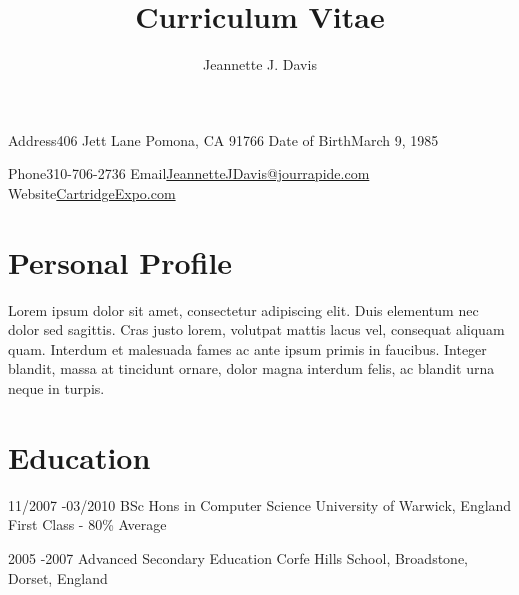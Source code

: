 \documentclass[10pt]{article} %
\title{Curriculum Vitae}
\author{Jeannette J. Davis}
\begin{document}
\makecvtitle

\begin{cvinfosection}{
  \begin{cvinfocolumn}
    {Address}{406 Jett Lane}
    {}{Pomona, CA 91766}
    {Date of Birth}{March 9, 1985}
    {}{}
  \end{cvinfocolumn}
}
{
  \begin{cvinfocolumn}
    {Phone}{310-706-2736}
    {Email}{\href{mailto:JeannetteJDavis@jourrapide.com}{JeannetteJDavis@jourrapide.com}}
    {Website}{\href{http://CartridgeExpo.com}{CartridgeExpo.com}}
    {}{}
  \end{cvinfocolumn}
}
\end{cvinfosection}

\section*{Personal Profile}

Lorem ipsum dolor sit amet, consectetur adipiscing elit. Duis elementum nec dolor sed sagittis. Cras justo lorem, volutpat mattis lacus vel, consequat aliquam quam. Interdum et malesuada fames ac ante ipsum primis in faucibus. Integer blandit, massa at tincidunt ornare, dolor magna interdum felis, ac blandit urna neque in turpis.




\section*{Education}

\begin{education}
  {11/2007 -}{03/2010}
  {BSc Hons in Computer Science}
  {University of Warwick, England}
  {First Class - 80\% Average}
\end{education}


\begin{education}
  {2005 -}{2007}
  {Advanced Secondary Education}
  {Corfe Hills School, Broadstone, Dorset, England}
  {}
\end{education}

\end{document}
